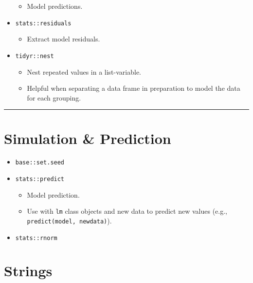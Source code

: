 \documentclass[
]{book}
\providecommand{\tightlist}{%
  \setlength{\itemsep}{0pt}\setlength{\parskip}{0pt}}
\begin{document}
\begin{itemize}
  \begin{itemize}
  \tightlist
  \item
    Model predictions.
  \end{itemize}
\item
  \texttt{stats::residuals}

  \begin{itemize}
  \tightlist
  \item
    Extract model residuals.
  \end{itemize}
\item
  \texttt{tidyr::nest}

  \begin{itemize}
  \tightlist
  \item
    Nest repeated values in a list-variable.
  \item
    Helpful when separating a data frame in preparation to model the data for each grouping.
  \end{itemize}
\end{itemize}

\begin{center}\rule{0.5\linewidth}{0.5pt}\end{center}

\hypertarget{simulation-prediction}{%
\section{Simulation \& Prediction}\label{simulation-prediction}}

\begin{itemize}
\tightlist
\item
  \texttt{base::set.seed}
\item
  \texttt{stats::predict}

  \begin{itemize}
  \tightlist
  \item
    Model prediction.
  \item
    Use with \texttt{lm} class objects and new data to predict new values (e.g., \texttt{predict(model,\ newdata)}).
  \end{itemize}
\item
  \texttt{stats::rnorm}
\end{itemize}

\hypertarget{strings-1}{%
\section{Strings}\label{strings-1}}
\end{document}
